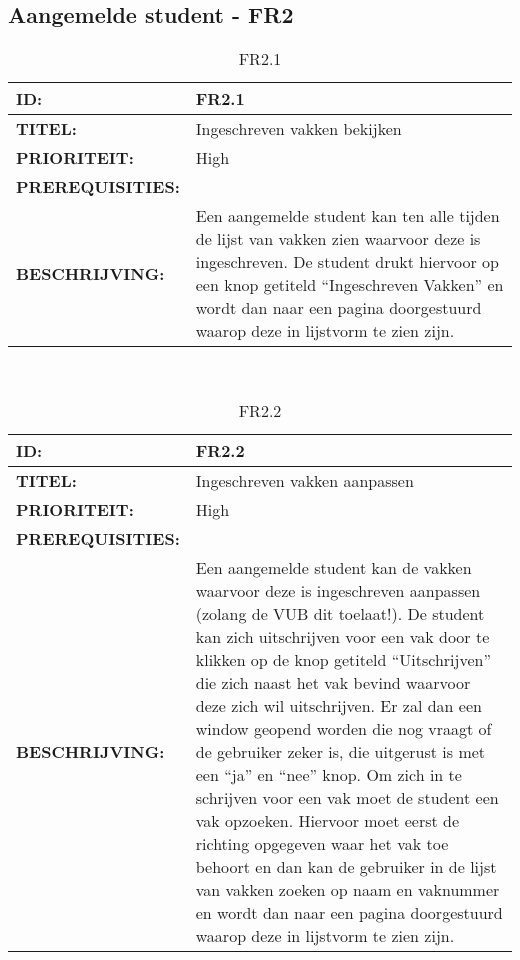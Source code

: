 \subsection{Aangemelde student - FR2}

\noindent\begin{table}[H]
            \begin{tabular}{l | p{10cm}}
                \textbf{ID:} & FR2.1 \\ \hline
                \textbf{TITEL:} & Ingeschreven vakken bekijken\\ \hline
                \textbf{PRIORITEIT:} &  High \\ \hline
                \textbf{PREREQUISITIES:} & \\ \hline
                \textbf{BESCHRIJVING:} & Een aangemelde student kan ten alle tijden de lijst van vakken zien waarvoor deze is ingeschreven. 
                                        De student drukt hiervoor op een knop getiteld “Ingeschreven Vakken” en wordt dan naar een pagina doorgestuurd waarop deze in lijstvorm te zien zijn.\\
            \end{tabular}\\
            \caption{FR2.1}
            \label{tab:FR2.1}
        \end{table}


\noindent\begin{table}[H]
            \begin{tabular}{l | p{10cm}}
                \textbf{ID:} & FR2.2 \\ \hline
                \textbf{TITEL:} & Ingeschreven vakken aanpassen\\ \hline
                \textbf{PRIORITEIT:} &  High \\ \hline
                \textbf{PREREQUISITIES:} & \\ \hline
                \textbf{BESCHRIJVING:} & Een aangemelde student kan de vakken waarvoor deze is ingeschreven aanpassen (zolang de VUB dit toelaat!). 
                                        De student kan zich uitschrijven voor een vak door te klikken op de knop getiteld “Uitschrijven” die zich naast het vak bevind waarvoor deze zich wil uitschrijven. 
                                        Er zal dan een window geopend worden die nog vraagt of de gebruiker zeker is, die uitgerust is met een “ja” en “nee” knop. 
                                        Om zich in te schrijven voor een vak moet de student een vak opzoeken. 
                                        Hiervoor moet eerst de richting opgegeven waar het vak toe behoort en dan kan de gebruiker in de lijst van vakken zoeken op naam en vaknummer en wordt dan naar een pagina doorgestuurd waarop deze in lijstvorm te zien zijn.\\
            \end{tabular}\\
            \caption{FR2.2}
            \label{tab:FR2.2}
        \end{table}

